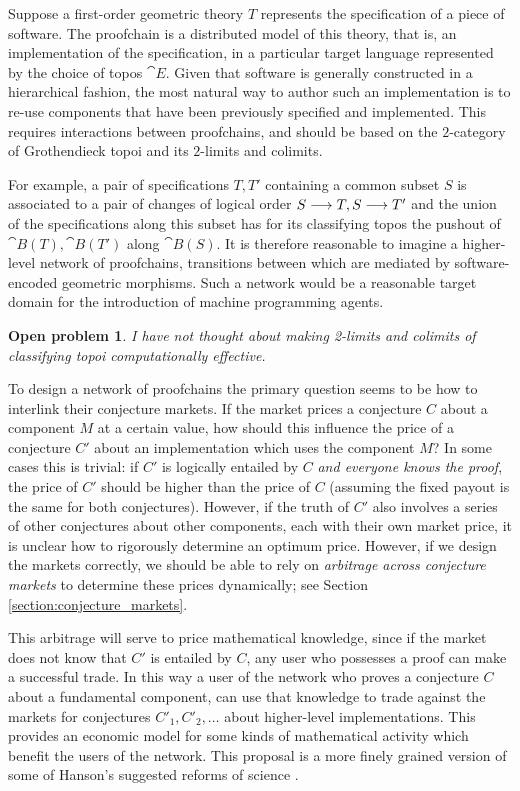 \documentclass[english,letter paper,12pt,reqno]{article}
\theoremstyle{example}
\newtheorem{problem}[theorem]{Open problem}
\begin{document}
Suppose a first-order geometric theory $T$ represents the specification of a piece of software. The proofchain is a distributed model of this theory, that is, an implementation of the specification, in a particular target language represented by the choice of topos $\cat{E}$. Given that software is generally constructed in a hierarchical fashion, the most natural way to author such an implementation is to re-use components that have been previously specified and implemented. This requires interactions between proofchains, and should be based on the $2$-category of Grothendieck topoi and its $2$-limits and colimits.

For example, a pair of specifications $T,T'$ containing a common subset $S$ is associated to a pair of changes of logical order $S \longrightarrow T, S \longrightarrow T'$ and the union of the specifications along this subset has for its classifying topos the pushout of $\cat{B}(T), \cat{B}(T')$ along $\cat{B}(S)$. It is therefore reasonable to imagine a higher-level network of proofchains, transitions between which are mediated by software-encoded geometric morphisms. Such a network would be a reasonable target domain for the introduction of machine programming agents.

\begin{problem} I have not thought about making 2-limits and colimits of classifying topoi computationally effective.
\end{problem}

To design a network of proofchains the primary question seems to be how to interlink their conjecture markets. If the market prices a conjecture $C$ about a component $M$ at a certain value, how should this influence the price of a conjecture $C'$ about an implementation which uses the component $M$? In some cases this is trivial: if $C'$ is logically entailed by $C$ \emph{and everyone knows the proof}, the price of $C'$ should be higher than the price of $C$ (assuming the fixed payout is the same for both conjectures). However, if the truth of $C'$ also involves a series of other conjectures about other components, each with their own market price, it is unclear how to rigorously determine an optimum price. However, if we design the markets correctly, we should be able to rely on \emph{arbitrage across conjecture markets} to determine these prices dynamically; see Section \ref{section:conjecture_markets}.

This arbitrage will serve to price mathematical knowledge, since if the market does not know that $C'$ is entailed by $C$, any user who possesses a proof can make a successful trade. In this way a user of the network who proves a conjecture $C$ about a fundamental component, can use that knowledge to trade against the markets for conjectures $C'_1,C'_2,\ldots$ about higher-level implementations. This provides an economic model for some kinds of mathematical activity which benefit the users of the network. This proposal is a more finely grained version of some of Hanson's suggested reforms of science \cite{hanson1,hanson2}.
\end{document}
